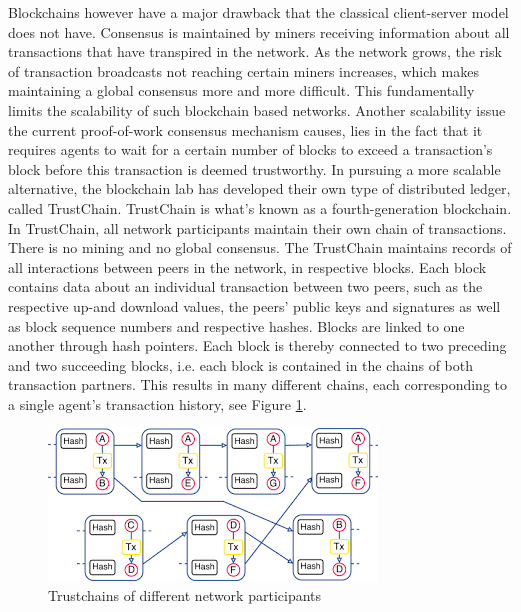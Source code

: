 \documentclass[sigconf]{acmart}
\theoremstyle{definition}
\begin{document}
\noindent Blockchains however have a major drawback that the classical client-server model does not have. Consensus is maintained by miners receiving information about all transactions that have transpired in the network. As the network grows, the risk of transaction broadcasts not reaching certain miners increases, which makes maintaining a global consensus more and more difficult. This fundamentally limits the scalability of such blockchain based networks. Another scalability issue the current proof-of-work consensus mechanism causes, lies in the fact that it requires agents to wait for a certain number of blocks to exceed a transaction's block before this transaction is deemed trustworthy. In pursuing a more scalable alternative, the blockchain lab has developed their own type of distributed ledger, called TrustChain. TrustChain is what's known as a fourth-generation blockchain. \vspace{1em}\\

\noindent In TrustChain, all network participants maintain their own chain of transactions. There is no mining and no global consensus. The TrustChain maintains records of all interactions between peers in the network, in respective blocks. Each block contains data about an individual transaction between two peers, such as the respective up-and download values, the peers' public keys and signatures as well as block sequence numbers and respective hashes. Blocks are linked to one another through hash pointers. Each block is thereby connected to two preceding and two succeeding blocks, i.e. each block is contained in the chains of both transaction partners. This results in many different chains, each corresponding to a single agent's transaction history, see Figure \ref{fig:Trustchain}\citep{TrustChain: A Sybil-resistant scalable blockchain}. \vspace{1em}\\

\begin{figure}
\includegraphics[scale=0.6]{Trustchain}
\caption{Trustchains of different network participants}
\label{fig:Trustchain}
\end{figure} 
\end{document}

